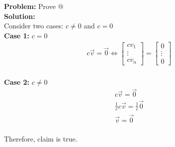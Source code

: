 \documentclass[11pt]{article}
\makeatletter
\theoremstyle{plain}
\theoremstyle{remark}
\theoremstyle{plain}
\newcommand{\bd}{\textbf}
\newcommand*{\rom}[1]{\expandafter\@slowromancap\romannumeral #1@}
\makeatother
\begin{document}
\begin{tcolorbox}[colback=magenta!5!white,colframe = magenta!75!black,title=Example]
    \bd{Problem:} Prove \rom{11} \\

    \bd{Solution:} \\

    Consider two cases: $c\neq 0$ and $c = 0$\\
    
    \bd{Case 1:} $c = 0$
    \begin{align*}
        c\overrightarrow{v} = \overrightarrow{0} \iff \begin{bmatrix}
            cv_1 \\ \vdots\\cv_n
        \end{bmatrix} =  \begin{bmatrix}
            0 \\ \vdots \\0
        \end{bmatrix} \\
    \end{align*}

    \bd{Case 2:} $c\neq 0$
    \begin{align*}
        c\overrightarrow{v} = \overrightarrow{0} \\
        \frac{1}{c}c\overrightarrow{v} = \frac{1}{c}\overrightarrow{0} \\
        \overrightarrow{v} = \overrightarrow{0} \\
    \end{align*}

    Therefore, claim is true.

\end{tcolorbox}   
\end{document}

